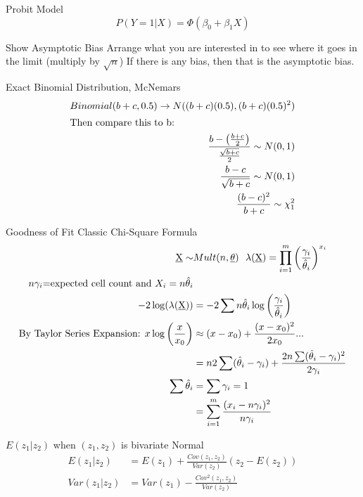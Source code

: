 \documentclass[avery5388,grid,frame]{flashcards}
\begin{document}
\begin{flashcard}{Probit Model}
\bigskip\bigskip\bigskip
\begin{equation*}
P(Y=1|X)=\Phi(\beta_0+\beta_1X)
\end{equation*}
\end{flashcard}
\begin{flashcard}{Show Asymptotic Bias}
\bigskip\bigskip\bigskip
Arrange what you are interested in to see where it goes in the limit (multiply by $\sqrt{n}$) If there is any bias, then that is the asymptotic bias.
\end{flashcard}
\begin{flashcard}{Exact Binomial Distribution, McNemars}
\bigskip\bigskip\bigskip
{\begin{align*}
Binomial(b+c,0.5) \rightarrow N((b+c)(0.5),(b+c)(0.5)^2)\\
\intertext{Then compare this to b:}
\frac{b-\left(\frac{b+c}{2}\right)}{\frac{\sqrt{b+c}}{2}}\sim N(0,1)\\
\frac{b-c}{\sqrt{b+c}}\sim N(0,1)\\
\frac{(b-c)^2}{b+c}\sim \chi^2_1
\end{align*}}
\end{flashcard}
\begin{flashcard}[Proof]{Goodness of Fit Classic Chi-Square Formula}
\small{
{\begin{align*}
\underbar{X}\sim&Mult(n,\underbar{$\theta$})\:\:\:\lambda(\underbar{X})=\prod_{i=1}^m\left(\frac{\gamma_i}{\hat{\theta}_i}\right)^{x_i}\\
\textrm{  $n\gamma_i$=expected cell count and $X_i=n\hat{\theta}_i$}\\
-2\log(\lambda(\underbar{X}))&=-2\sum n\hat{\theta}_i\log\left(\frac{\gamma_i}{\hat{\theta}_i}\right)\\
\textrm{By Taylor Series Expansion:  }
x\log\left(\frac{x}{x_0}\right)&\approx(x-x_0)+\frac{(x-x_0)^2}{2x_0}...\\
&=n2\sum(\hat{\theta}_i-\gamma_i)+\frac{2n\sum(\hat{\theta}_i-\gamma_i)^2}{2\gamma_i}\\
\sum\hat{\theta}_i&=\sum\gamma_i=1\\
&=\sum_{i=1}^m\frac{(x_i-n\gamma_i)^2}{n\gamma_i}
\end{align*}}}
\end{flashcard}
\begin{flashcard}{$E(z_1|z_2)$ when $(z_1,z_2)$ is bivariate Normal}
\bigskip\bigskip\bigskip
{\begin{align*}
E(z_1|z_2)&=E(z_1)+\frac{Cov(z_1,z_2)}{Var(z_2)}(z_2-E(z_2))\\
Var(z_1|z_2)&=Var(z_1)-\frac{Cov^2(z_1,z_2)}{Var(z_2)}
\end{align*}}
\end{flashcard}
\end{document}

